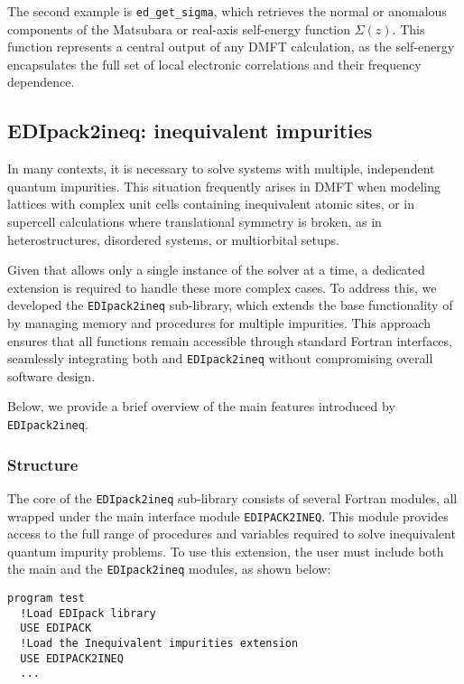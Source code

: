 \documentclass[edipack2.tex]{subfiles}
\begin{document}
The second example is \texttt{ed\_get\_sigma}, which retrieves the 
normal or anomalous components of the Matsubara or real-axis 
self-energy function $\Sigma(z)$. This function represents a central 
output of any DMFT calculation, as the self-energy encapsulates the 
full set of local electronic correlations and their frequency 
dependence.







\subsection{EDIpack2ineq: inequivalent impurities}\label{sSecIneq}
In many contexts, it is necessary to solve systems with multiple, 
independent quantum impurities. This situation frequently arises in 
DMFT when modeling lattices with complex unit cells containing 
inequivalent atomic sites, or in supercell calculations where 
translational symmetry is broken, as in heterostructures, disordered 
systems, or multiorbital setups. 

Given that \NAME allows only a single instance of the solver at a 
time, a dedicated extension is required to handle these more complex 
cases. To address this, we developed the {\tt EDIpack2ineq} 
sub-library, which extends the base functionality of \NAME by managing 
memory and procedures for multiple impurities. This approach ensures 
that all functions remain accessible through standard Fortran 
interfaces, seamlessly integrating both \NAME and {\tt EDIpack2ineq} 
without compromising overall software design.

Below, we provide a brief overview of the main features introduced by 
{\tt EDIpack2ineq}.

\subsubsection{Structure}\label{ssSecIneqStructure}
The core of the {\tt EDIpack2ineq} sub-library consists of several 
Fortran modules, all wrapped under the main interface module 
{\tt EDIPACK2INEQ}. This module provides access to the full range of 
procedures and variables required to solve inequivalent quantum 
impurity problems. To use this extension, the user must include both 
the main \NAME and the {\tt EDIpack2ineq} modules, as shown below:
\begin{lstlisting}[style=fstyle,numbers=none,basicstyle={\scriptsize\ttfamily}]
program test
  !Load EDIpack library 
  USE EDIPACK
  !Load the Inequivalent impurities extension
  USE EDIPACK2INEQ
  ...
\end{lstlisting}
\end{document}
